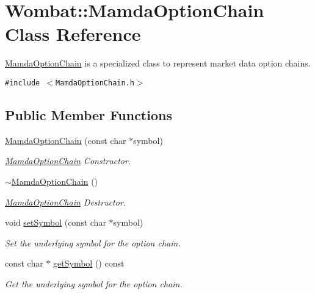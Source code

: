\hypertarget{classWombat_1_1MamdaOptionChain}{
\section{Wombat::Mamda\-Option\-Chain Class Reference}
\label{classWombat_1_1MamdaOptionChain}
}
\hyperlink{classWombat_1_1MamdaOptionChain}{Mamda\-Option\-Chain} is a specialized class to represent market data option chains.  


{\tt \#include $<$Mamda\-Option\-Chain.h$>$}

\subsection*{Public Member Functions}
\begin{CompactItemize}
\item 
\hyperlink{classWombat_1_1MamdaOptionChain_c696e591f54e1237478eb9fb03fde9ad}{Mamda\-Option\-Chain} (const char $\ast$symbol)
\begin{CompactList}\small\item\em \hyperlink{classWombat_1_1MamdaOptionChain}{Mamda\-Option\-Chain} Constructor. \item\end{CompactList}\item 
\hyperlink{classWombat_1_1MamdaOptionChain_1571f9e007a6fa33adfc6734201d18e9}{$\sim$Mamda\-Option\-Chain} ()
\begin{CompactList}\small\item\em \hyperlink{classWombat_1_1MamdaOptionChain}{Mamda\-Option\-Chain} Destructor. \item\end{CompactList}\item 
void \hyperlink{classWombat_1_1MamdaOptionChain_73abe9e7b8d73a0f7508cd12fa1a763e}{set\-Symbol} (const char $\ast$symbol)
\begin{CompactList}\small\item\em Set the underlying symbol for the option chain. \item\end{CompactList}\item 
const char $\ast$ \hyperlink{classWombat_1_1MamdaOptionChain_a2d2a98a0f219cb7a83a273710bafa8e}{get\-Symbol} () const 
\begin{CompactList}\small\item\em Get the underlying symbol for the option chain. \item\end{CompactList}\item 

\end{CompactItemize}

